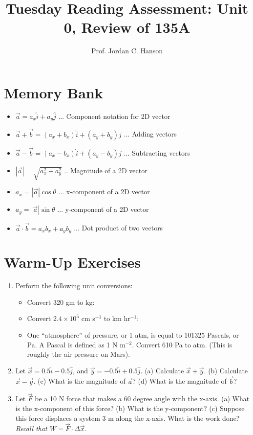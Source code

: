 \documentclass{article}
\begin{document}
\title{Tuesday Reading Assessment: Unit 0, Review of 135A}
\author{Prof. Jordan C. Hanson}

\maketitle

\section{Memory Bank}

\begin{itemize}
\item $\vec{a} = a_x \hat{i} + a_y \hat{j}$ ... Component notation for 2D vector
\item $\vec{a} + \vec{b} = (a_x + b_x)\hat{i} + (a_y + b_y)\hat{j}$ ... Adding vectors
\item $\vec{a} - \vec{b} = (a_x - b_x)\hat{i} + (a_y - b_y)\hat{j}$ ... Subtracting vectors
\item $|\vec{a}| = \sqrt{a_x^2 + a_y^2}$ .. Magnitude of a 2D vector
\item $a_x = |\vec{a}|\cos\theta$ ... x-component of a 2D vector
\item $a_y = |\vec{a}|\sin\theta$ ... y-component of a 2D vector
\item $\vec{a} \cdot \vec{b} = a_x b_x + a_y b_y$ ... Dot product of two vectors
\end{itemize}

\section{Warm-Up Exercises}

\begin{enumerate}
\item Perform the following unit conversions:
\begin{itemize}
\item Convert 320 gm to kg:
\item Convert $2.4 \times 10^{5}$ cm s$^{-1}$ to km hr$^{-1}$:
\item One ``atmosphere'' of pressure, or 1 atm, is equal to 101325 Pascals, or Pa.  A Pascal is defined as 1 N m$^{-2}$.  Convert 610 Pa to atm. (This is roughly the air pressure on Mars). \\ \vspace{0.5cm}
\end{itemize}
\item Let $\vec{x} = 0.5 \hat{i} - 0.5\hat{j}$, and $\vec{y} = -0.5\hat{i} + 0.5\hat{j}$. (a) Calculate $\vec{x} + \vec{y}$.  (b) Calculate $\vec{x} - \vec{y}$. (c) What is the magnitude of $\vec{a}$? (d) What is the magnitude of $\vec{b}$? \\ \vspace{2cm}
\item Let $\vec{F}$ be a 10 N force that makes a 60 degree angle with the x-axis. (a) What is the x-component of this force? (b) What is the y-component? (c) Suppose this force displaces a system 3 m along the x-axis.  What is the work done?  \textit{Recall that $W = \vec{F} \cdot \Delta \vec{x}$.}
\end{enumerate}
\end{document}
